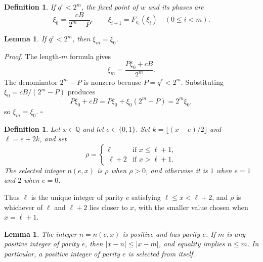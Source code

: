 \documentclass[11pt,letterpaper]{article}
\newcommand{\Q}{\mathbb{Q}}
\newtheorem{lemma}[theorem]{Lemma}
\newtheorem{definition}[theorem]{Definition}
\newenvironment{proof}{\noindent\textit{Proof.}}{\hfill\(\square\)}
\begin{document}
\begin{definition}
If \(q^r<2^m\), the fixed point of \(w\) and its phases are
\[
\xi_0=\frac{cB}{2^m-P},\qquad
\xi_{i+1}=F_{e_i}(\xi_i)\quad(0\le i<m).
\]
\end{definition}

\begin{lemma}
\label{lem:return}
If \(q^r<2^m\), then \(\xi_m=\xi_0\).
\end{lemma}

\begin{proof}
The length-\(m\) formula gives
\[
\xi_m=\frac{P\xi_0+cB}{2^m}.
\]
The denominator \(2^m-P\) is nonzero because \(P=q^r<2^m\). Substituting \(\xi_0=cB/(2^m-P)\) produces
\[
P\xi_0+cB
=P\xi_0+\xi_0(2^m-P)
=2^m\xi_0,
\]
so \(\xi_m=\xi_0\).
\end{proof}

\begin{definition}
\label{def:nearest}
Let \(x\in\Q\) and let \(e\in\{0,1\}\). Set \(k=\lfloor(x-e)/2\rfloor\) and \(\ell=e+2k\), and set
\[
\rho=
\begin{cases}
\ell & \text{if }x\le \ell+1,\\
\ell+2 & \text{if }x>\ell+1.
\end{cases}
\]
The selected integer \(n(e,x)\) is \(\rho\) when \(\rho>0\), and otherwise it is \(1\) when \(e=1\) and \(2\) when \(e=0\).
\end{definition}

Thus \(\ell\) is the unique integer of parity \(e\) satisfying \(\ell\le x<\ell+2\), and \(\rho\) is whichever of \(\ell\) and \(\ell+2\) lies closer to \(x\), with the smaller value chosen when \(x=\ell+1\).

\begin{lemma}
\label{lem:nearest}
The integer \(n=n(e,x)\) is positive and has parity \(e\). If \(m\) is any positive integer of parity \(e\), then \(\lvert x-n\rvert\le\lvert x-m\rvert\), and equality implies \(n\le m\). In particular, a positive integer of parity \(e\) is selected from itself.
\end{lemma}
\end{document}
